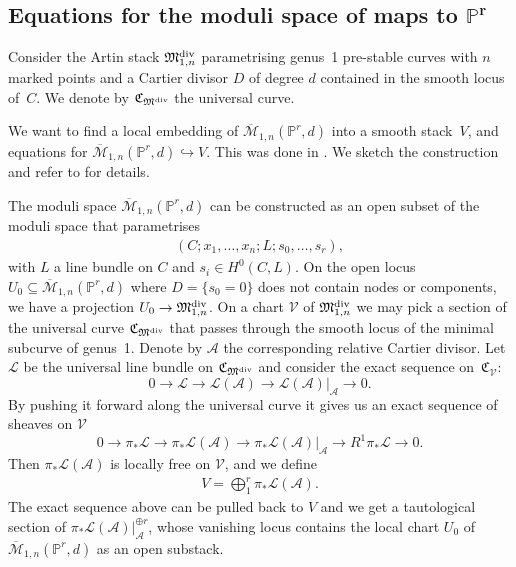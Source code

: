 \documentclass[pdftex]{sigma}
\numberwithin{equation}{section}
\newcommand{\MM}[4]{\overline{\mathcal M}_{#1,#2}(#3,#4)}
\theoremstyle{plain}
\theoremstyle{definition}
\theoremstyle{remark}
\begin{document}
\subsection[Equations for the moduli space of maps to $\mathbb P^r$]{Equations for the moduli space of maps to $\boldsymbol{\mathbb P^r}$} \label{eq from twist}

 \begin{notation} Consider the Artin stack $\mathfrak{M}^{\rm div}_{1,n}$ parametrising genus~1 pre-stable curves with $n$ marked points and a Cartier divisor $D$ of degree $d$ contained in the smooth locus of~$C$. We denote by $\mathfrak{C}_{\mathfrak{M}^{\rm div}}$ the universal curve.
 \end{notation}

We want to find a local embedding of $\MM{1}{n}{\mathbb P^r}{d}$ into a smooth stack~$V$, and equations for $\MM{1}{n}{\mathbb P^r}{d}\hookrightarrow V$. This was done in \cite{CF-K,HL}. We sketch the construction and refer to \cite{HL} for details.

The moduli space $\MM{1}{n}{\mathbb P^r}{d}$ can be constructed as an open subset of the moduli space that parametrises \begin{gather*}(C;x_1,\ldots,x_n;L;s_0,\ldots,s_r),\end{gather*} with $L$ a line bundle on $C$ and $s_i\in H^0(C,L)$. On the open locus $U_0\subseteq \MM{1}{n}{\mathbb P^r}{d}$ where $D=\{s_0=0\}$ does not contain nodes or components, we have a projection
$U_0\to\mathfrak{M}^{\rm div}_{1,n}$. On a chart $\mathcal V$ of $\mathfrak{M}^{\rm div}_{1,n}$ we may pick a section of the universal curve $\mathfrak C_{\mathfrak{M}^{\rm div}}$ that passes through the smooth locus of the minimal subcurve of genus~1. Denote by $\mathcal A$ the corresponding relative Cartier divisor. Let $\mathcal L$ be the universal line bundle on $\mathfrak{C}_{\mathfrak{M}^{\rm div}}$ and consider the exact sequence on~$\mathfrak{C}_{\mathcal V}$:
\[
 0\to \mathcal L\to \mathcal L(\mathcal A)\to \mathcal L(\mathcal A)|_{\mathcal A}\to 0.
\]
By pushing it forward along the universal curve it gives us an exact sequence of sheaves on $\mathcal V$
\begin{equation*}%
 0\to \pi_*\mathcal L\to\pi_*\mathcal L(\mathcal A)\to \pi_*\mathcal L(\mathcal A)|_{\mathcal A}\to R^1\pi_*\mathcal L\to 0.
\end{equation*}
Then $\pi_*\mathcal L(\mathcal A)$ is locally free on $\mathcal V$, and we define \begin{gather*}V=\bigoplus _{1}^r\pi_*\mathcal L(\mathcal A).\end{gather*} The exact sequence above can be pulled back to $V$ and we get a tautological section of $\pi_*\mathcal L(\mathcal A)|_{\mathcal A}^{\oplus r}$, whose vanishing locus contains the local chart $U_0$ of $\MM{1}{n}{\mathbb P^r}{d}$ as an open substack.
\end{document}
